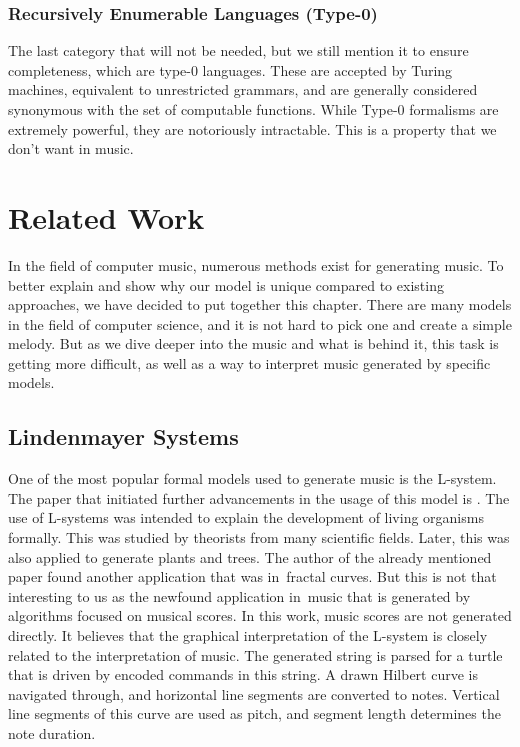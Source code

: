 \subsection*{Recursively Enumerable Languages (Type-0)}
The last category that will not be needed, but we still mention it to ensure completeness, which are type-0 languages. These are accepted by Turing machines, equivalent to unrestricted grammars, and are generally considered synonymous with the set of computable functions. While Type-0 formalisms are extremely powerful, they are notoriously intractable. This is a property that we don't want in music.

\chapter{Related Work}
\label{chap3}
In the field of computer music, numerous methods exist for generating music. To better explain and show why our model is unique compared to existing approaches, we have decided to put together this chapter. There are many models in the field of computer science, and it is not hard to pick one and create a simple melody. But as we dive deeper into the music and what is behind it, this task is getting more difficult, as well as a way to interpret music generated by specific models.

\section{Lindenmayer Systems}
One of the most popular formal models used to generate music is the L-system. The paper that initiated further advancements in the usage of this model is \cite{lsystems1}. The use of L-systems was intended to explain the development of living organisms formally. This was studied by theorists from many scientific fields. Later, this was also applied to generate plants and trees. The author of the already mentioned paper found another application that was in~fractal curves. But this is not that interesting to us as the newfound application in~music that is generated by algorithms focused on musical scores. In this work, music scores are not generated directly. It believes that the graphical interpretation of the L-system is closely related to the interpretation of music. The generated string is parsed for a turtle that is driven by encoded commands in this string. A drawn Hilbert curve is navigated through, and horizontal line segments are converted to notes. Vertical line segments of this curve are used as pitch, and segment length determines the note duration.

